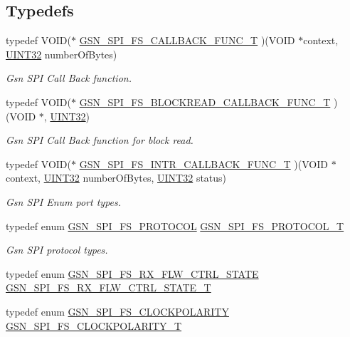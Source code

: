 \subsection*{Typedefs}
\begin{DoxyCompactItemize}
\item 
typedef VOID($\ast$ \hyperlink{a00655_gaa58c26aaa273da2e8ff41d1833d1147e}{GSN\_\-SPI\_\-FS\_\-CALLBACK\_\-FUNC\_\-T} )(VOID $\ast$context, \hyperlink{a00660_gae1e6edbbc26d6fbc71a90190d0266018}{UINT32} numberOfBytes)
\begin{DoxyCompactList}\small\item\em Gsn SPI Call Back function. \end{DoxyCompactList}\item 
typedef VOID($\ast$ \hyperlink{a00655_ga53ed03a9d5eb404abf8ea4afb4b2ac02}{GSN\_\-SPI\_\-FS\_\-BLOCKREAD\_\-CALLBACK\_\-FUNC\_\-T} )(VOID $\ast$, \hyperlink{a00660_gae1e6edbbc26d6fbc71a90190d0266018}{UINT32})
\begin{DoxyCompactList}\small\item\em Gsn SPI Call Back function for block read. \end{DoxyCompactList}\item 
typedef VOID($\ast$ \hyperlink{a00655_gaccc2e6d52833a5b6d9bbdd2506521d89}{GSN\_\-SPI\_\-FS\_\-INTR\_\-CALLBACK\_\-FUNC\_\-T} )(VOID $\ast$context, \hyperlink{a00660_gae1e6edbbc26d6fbc71a90190d0266018}{UINT32} numberOfBytes, \hyperlink{a00660_gae1e6edbbc26d6fbc71a90190d0266018}{UINT32} status)
\begin{DoxyCompactList}\small\item\em Gsn SPI Enum port types. \end{DoxyCompactList}\item 
typedef enum \hyperlink{a00655_ga1185ce73b403aa52f97a2b0e4146a481}{GSN\_\-SPI\_\-FS\_\-PROTOCOL} \hyperlink{a00655_gaa9b496d91ebb6c1e80cbd1b076c55f40}{GSN\_\-SPI\_\-FS\_\-PROTOCOL\_\-T}
\begin{DoxyCompactList}\small\item\em Gsn SPI protocol types. \end{DoxyCompactList}\item 
typedef enum \hyperlink{a00589_a8fba8ef99bde7d11e4f9178b501de8cd}{GSN\_\-SPI\_\-FS\_\-RX\_\-FLW\_\-CTRL\_\-STATE} \hyperlink{a00589_a3798d6bdf090c54eb4ca194e03183f1a}{GSN\_\-SPI\_\-FS\_\-RX\_\-FLW\_\-CTRL\_\-STATE\_\-T}
\item 
typedef enum \hyperlink{a00655_ga5d0a21479bf57ff38c1c967f95ea5e83}{GSN\_\-SPI\_\-FS\_\-CLOCKPOLARITY} \hyperlink{a00655_ga68952a1f7c2baa0ffb682a9689229eaf}{GSN\_\-SPI\_\-FS\_\-CLOCKPOLARITY\_\-T}

\end{DoxyCompactItemize}
